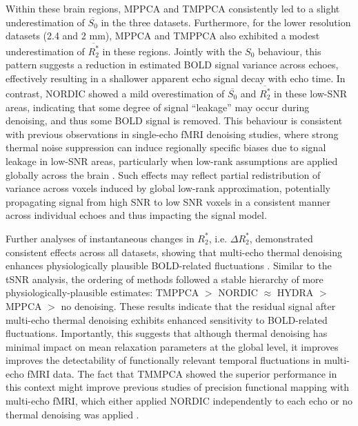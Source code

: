 Within these brain regions, MPPCA and TMPPCA consistently led to a slight underestimation of $\overline{S_0}$ in the three datasets. Furthermore, for the lower resolution datasets (2.4 and 2 mm), MPPCA and TMPPCA also exhibited a modest underestimation of $\overline{R_2^*}$ in these regions. Jointly with the $S_0$ behaviour, this pattern suggests a reduction in estimated BOLD signal variance across echoes, effectively resulting in a shallower apparent echo signal decay with echo time. 
In contrast, NORDIC showed a mild overestimation of $\overline{S_0}$ and $\overline{R_2^*}$ in these low-SNR areas, indicating that some degree of signal “leakage” may occur during denoising, and thus some BOLD signal is removed. This behaviour is consistent with previous observations in single-echo fMRI denoising studies, where strong thermal noise suppression can induce regionally specific biases due to signal leakage in low-SNR areas, particularly when low-rank assumptions are applied globally across the brain \citep{fernandesMPPCADenoisingFMRI2023a, zhu2022denoise, faesEvaluatingEffectDenoising2024}. Such effects may reflect partial redistribution of variance across voxels induced by global low-rank approximation, potentially propagating signal from high SNR to low SNR voxels in a consistent manner across individual echoes and thus impacting the signal model. 

Further analyses of instantaneous changes in $R_2^*$, i.e. $\Delta R_2^*$, demonstrated consistent effects across all datasets, showing that multi-echo thermal denoising enhances physiologically plausible BOLD-related fluctuations \citep{caballerogaudesParadigmFreeMapping2011}. Similar to the tSNR analysis, the ordering of methods followed a stable hierarchy of more physiologically-plausible estimates: TMPPCA $>$ NORDIC  $\approx$ HYDRA $>$ MPPCA $>$ no denoising. These results indicate that the residual signal after multi-echo thermal denoising exhibits enhanced sensitivity to BOLD-related fluctuations. Importantly, this suggests that although thermal denoising has minimal impact on mean relaxation parameters at the global level, it improves improves the detectability of functionally relevant temporal fluctuations in multi-echo fMRI data. The fact that TMMPCA showed the superior performance in this context might improve previous studies of precision functional mapping with multi-echo fMRI, which either applied NORDIC independently to each echo \cite{moserMultiechoAcquisitionThermal2025, krimmelHumanBrainstemsRed2025} or no thermal denoising was applied \citep{lynchRapidPrecisionFunctional2020, lynchFrontostriatalSalienceNetwork2024}.

